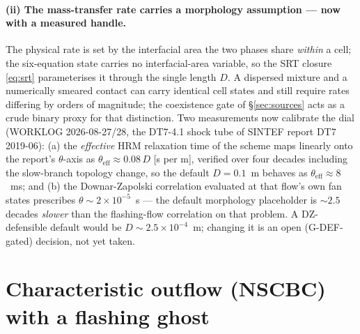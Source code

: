 \documentclass[11pt,a4paper]{article}
\begin{document}
\paragraph{(ii) The mass-transfer rate carries a morphology assumption ---
now with a measured handle.}
The physical rate is set by the interfacial area the two phases share
\emph{within} a cell; the six-equation state carries no interfacial-area
variable, so the SRT closure \eqref{eq:srt} parameterises it through the
single length $D$.  A dispersed mixture and a numerically smeared contact
can carry identical cell states and still require rates differing by
orders of magnitude; the coexistence gate of \S\ref{sec:sources} acts as a
crude binary proxy for that distinction.  Two measurements now calibrate
the dial (WORKLOG 2026-08-27/28, the DT7-4.1 shock tube of SINTEF report
DT7 2019-06): (a) the \emph{effective} HRM relaxation time of the scheme
maps linearly onto the report's $\theta$-axis as
$\theta_{\mathrm{eff}} \approx 0.08\,D$ [s per m], verified over four
decades including the slow-branch topology change, so the default
$D=0.1$~m behaves as $\theta_{\mathrm{eff}}\approx8$~ms; and (b) the
Downar-Zapolski correlation evaluated at that flow's own fan states
prescribes $\theta\sim2\times10^{-5}$~s --- the default morphology
placeholder is $\sim\!2.5$ decades \emph{slower} than the flashing-flow
correlation on that problem.  A DZ-defensible default would be
$D\sim2.5\times10^{-4}$~m; changing it is an open (G-DEF-gated) decision,
not yet taken.

\section{Characteristic outflow (NSCBC) with a flashing ghost}
\label{sec:nscbc}
\end{document}
